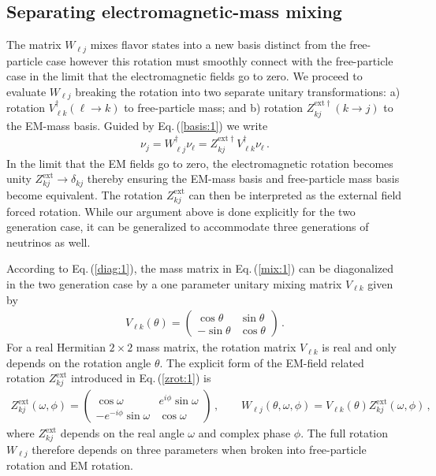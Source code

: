 \documentclass{ws-ijmpa}
\newcommand{\req}[1]{Eq.\,(\ref{#1})}
\begin{document}
\subsection{Separating electromagnetic-mass mixing}
\label{sec:zmixing}
The matrix $W_{\ell j}$ mixes flavor states into a new basis distinct from the free-particle case however this rotation must smoothly connect with the free-particle case in the limit that the electromagnetic fields go to zero. We proceed to evaluate $W_{\ell j}$ breaking the rotation into two separate unitary transformations: a) rotation $V_{\ell k}^{\dag}(\ell\rightarrow k)$ to free-particle mass; and b) rotation $Z_{kj}^{\mathrm{ext}\dag}(k\rightarrow j)$ to the EM-mass basis. Guided by \req{basis:1} we write
\begin{align}
\label{zrot:1}
\nu_{j} = W^{\dag}_{\ell j}\nu_{\ell} = Z_{kj}^{\mathrm{ext}\dag}V_{\ell k}^{\dag}\nu_{\ell}\,.
\end{align}
In the limit that the EM fields go to zero, the electromagnetic rotation becomes unity $Z_{kj}^\mathrm{ext}\rightarrow\delta_{kj}$ thereby ensuring the EM-mass basis and free-particle mass basis become equivalent. The rotation $Z_{kj}^\mathrm{ext}$ can then be interpreted as the external field forced rotation. While our argument above is done explicitly for the two generation case, it can be generalized to accommodate three generations of neutrinos as well.

According to \req{diag:1}, the mass matrix in \req{mix:1} can be diagonalized in the two generation case by a one parameter unitary mixing matrix $V_{\ell k}$ given by
\begin{align}
\label{rot:1}
V_{\ell k}(\theta)=
\begin{pmatrix}
\cos\theta & \sin\theta\\
-\sin\theta & \cos\theta
\end{pmatrix}\,.
\end{align}
For a real Hermitian $2\times 2$ mass matrix, the rotation matrix $V_{\ell k}$ is real and only depends on the rotation angle $\theta$. The explicit form of the EM-field related rotation $Z_{kj}^\mathrm{ext}$ introduced in \req{zrot:1} is
\begin{align}
\label{zrot:2}
Z_{kj}^\mathrm{ext}(\omega,\phi)=
\begin{pmatrix}
\cos\omega & e^{i\phi}\sin\omega\\
-e^{-i\phi}\sin\omega & \cos\omega
\end{pmatrix}\,,\qquad
W_{\ell j}(\theta,\omega,\phi)=V_{\ell k}(\theta)Z_{kj}^\mathrm{ext}(\omega,\phi)\,,
\end{align}
where $Z_{kj}^\mathrm{ext}$ depends on the real angle $\omega$ and complex phase $\phi$. The full rotation $W_{\ell j}$ therefore depends on three parameters when broken into free-particle rotation and EM rotation.
\end{document}
